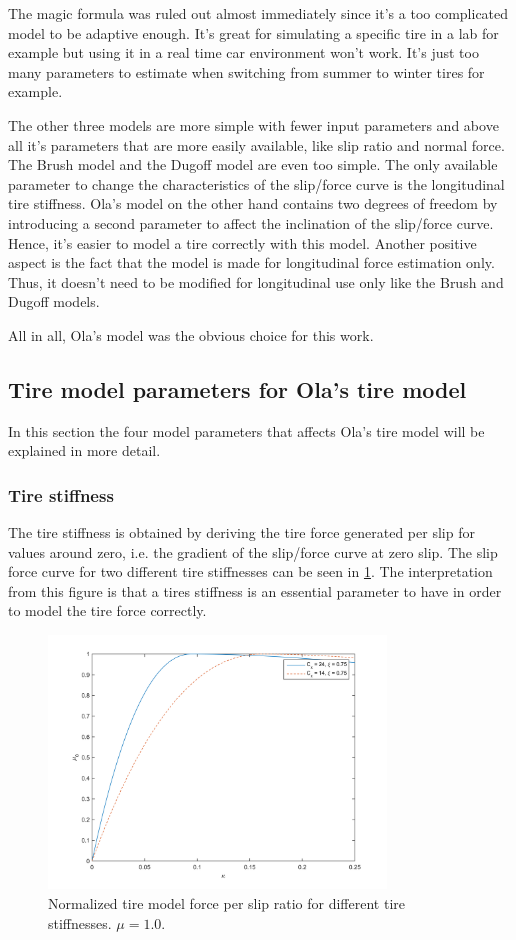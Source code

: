 The magic formula was ruled out almost immediately since it's a too complicated model to be adaptive enough. It's great for simulating a specific tire in a lab for example but using it in a real time car environment won't work. It's just too many parameters to estimate when switching from summer to winter tires for example. 

The other three models are more simple with fewer input parameters and above all it's parameters that are more easily available, like slip ratio and normal force. The Brush model and the Dugoff model are even too simple. The only available parameter to change the characteristics of the slip/force curve is the longitudinal tire stiffness. Ola's model on the other hand contains two degrees of freedom by introducing a second parameter to affect the inclination of the slip/force curve. Hence, it's easier to model a tire correctly with this model. Another positive aspect is the fact that the model is made for longitudinal force estimation only. Thus, it doesn't need to be modified for longitudinal use only like the Brush and Dugoff models. 

All in all, Ola's model was the obvious choice for this work.

\subsection{Tire model parameters for Ola's tire model}
In this section the four model parameters that affects Ola's tire model will be explained in more detail.

\subsubsection{Tire stiffness}
The tire stiffness is obtained by deriving the tire force generated per slip for values around zero, i.e. the gradient of the slip/force curve at zero slip. The slip force curve for two different tire stiffnesses can be seen in \ref{different_cx}. The interpretation from this figure is that a tires stiffness is an essential parameter to have in order to model the tire force correctly. 

\begin{figure}[h]
	\centering
	\includegraphics[width=0.8\textwidth]{Pictures/slipkraft_olika_cx}
	\caption {Normalized tire model force per slip ratio for different tire stiffnesses. $ \mu = 1.0 $.}
	\label{different_cx}
\end{figure}

